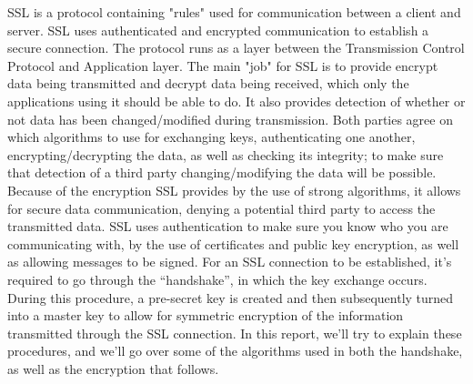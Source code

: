 SSL is a protocol containing "rules" used for communication between a client and server. SSL uses authenticated and encrypted communication to establish a secure connection. The protocol runs as a layer between the Transmission Control Protocol and Application layer. The main "job" for SSL is to provide encrypt data being transmitted and decrypt data being received, which only the applications using it should be able to do.\cite{oracleIntro} It also provides detection of whether or not data has been changed/modified during transmission. Both parties agree on which algorithms to use for exchanging keys, authenticating one another, encrypting/decrypting the data, as well as checking its integrity; to make sure that detection of a third party changing/modifying the data will be possible.
Because of the encryption SSL provides by the use of strong algorithms, it allows for secure data communication, denying a potential third party to access the transmitted data.\cite{ibmIntro}
SSL uses authentication to make sure you know who you are communicating with, by the use of certificates and public key encryption, as well as allowing messages to be signed.\cite{oracleIntro}
For an SSL connection to be established, it's required to go through the “handshake”, in which the key exchange occurs. During this procedure, a pre-secret key is created and then subsequently turned into a master key to allow for symmetric encryption of the information transmitted through the SSL connection.\cite{how2ssl}
In this report, we'll try to explain these procedures, and we'll go over some of the algorithms used in both the handshake, as well as the encryption that follows.